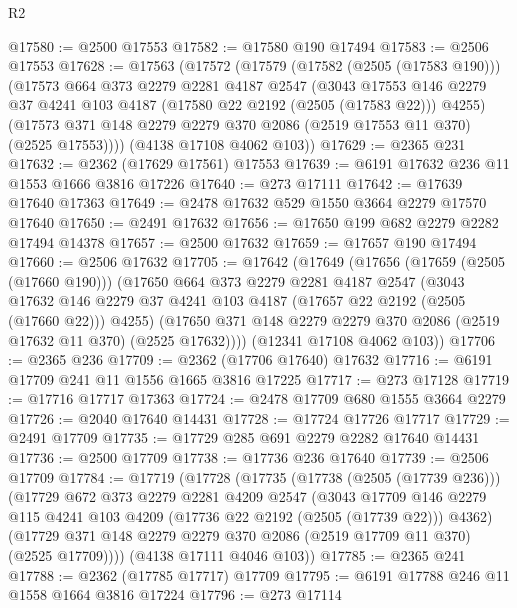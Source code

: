 \begin{lexlean}{R2}
\begin{coremodule}
@17580 := @2500 @17553
@17582 := @17580 @190 @17494
@17583 := @2506 @17553
@17628 := @17563
    (@17572
      (@17579
        (@17582 (@2505 (@17583 @190)))
        (@17573
          @664
          @373
          @2279
          @2281
          @4187
          @2547
          (@3043
            @17553
            @146
            @2279
            @37
            @4241
            @103
            @4187
            (@17580 @22 @2192 (@2505 (@17583 @22)))
            @4255)
          (@17573 @371 @148 @2279 @2279 @370 @2086 (@2519 @17553 @11 @370) (@2525 @17553))))
      (@4138 @17108 @4062 @103))
@17629 := @2365 @231
@17632 := @2362 (@17629 @17561) @17553
@17639 := @6191 @17632 @236 @11 @1553 @1666 @3816 @17226
@17640 := @273 @17111
@17642 := @17639 @17640 @17363
@17649 := @2478 @17632 @529 @1550 @3664 @2279 @17570 @17640
@17650 := @2491 @17632
@17656 := @17650 @199 @682 @2279 @2282 @17494 @14378
@17657 := @2500 @17632
@17659 := @17657 @190 @17494
@17660 := @2506 @17632
@17705 := @17642
    (@17649
      (@17656
        (@17659 (@2505 (@17660 @190)))
        (@17650
          @664
          @373
          @2279
          @2281
          @4187
          @2547
          (@3043
            @17632
            @146
            @2279
            @37
            @4241
            @103
            @4187
            (@17657 @22 @2192 (@2505 (@17660 @22)))
            @4255)
          (@17650 @371 @148 @2279 @2279 @370 @2086 (@2519 @17632 @11 @370) (@2525 @17632))))
      (@12341 @17108 @4062 @103))
@17706 := @2365 @236
@17709 := @2362 (@17706 @17640) @17632
@17716 := @6191 @17709 @241 @11 @1556 @1665 @3816 @17225
@17717 := @273 @17128
@17719 := @17716 @17717 @17363
@17724 := @2478 @17709 @680 @1555 @3664 @2279
@17726 := @2040 @17640 @14431
@17728 := @17724 @17726 @17717
@17729 := @2491 @17709
@17735 := @17729 @285 @691 @2279 @2282 @17640 @14431
@17736 := @2500 @17709
@17738 := @17736 @236 @17640
@17739 := @2506 @17709
@17784 := @17719
    (@17728
      (@17735
        (@17738 (@2505 (@17739 @236)))
        (@17729
          @672
          @373
          @2279
          @2281
          @4209
          @2547
          (@3043
            @17709
            @146
            @2279
            @115
            @4241
            @103
            @4209
            (@17736 @22 @2192 (@2505 (@17739 @22)))
            @4362)
          (@17729 @371 @148 @2279 @2279 @370 @2086 (@2519 @17709 @11 @370) (@2525 @17709))))
      (@4138 @17111 @4046 @103))
@17785 := @2365 @241
@17788 := @2362 (@17785 @17717) @17709
@17795 := @6191 @17788 @246 @11 @1558 @1664 @3816 @17224
@17796 := @273 @17114

\end{coremodule}
\end{lexlean}
